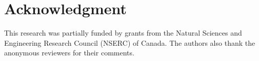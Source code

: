 \section*{Acknowledgment}

This research was partially funded by grants from the Natural Sciences and Engineering Research Council (NSERC) of Canada.
The authors also thank the anonymous reviewers for their comments.
